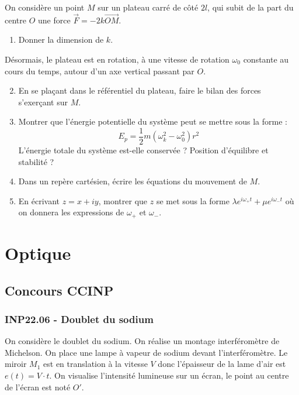 On considère un point $M$ sur un plateau carré de côté $2l$, qui subit de la part du centre $O$ une force $\overrightarrow{F} = -2k \overrightarrow{OM}$.

\begin{enumerate}
    \item Donner la dimension de $k$.
\end{enumerate}

Désormais, le plateau est en rotation, à une vitesse de rotation $\omega_0$ constante au cours du temps, autour d'un axe vertical passant par $O$.

\begin{enumerate}
    \setcounter{enumi}{1}
    \item En se plaçant dans le référentiel du plateau, faire le bilan des forces s'exerçant sur $M$.
    \item Montrer que l'énergie potentielle du système peut se mettre sous la forme :
    \[
    E_p = \frac{1}{2} m \left(\omega_k^2 - \omega_0^2\right) r^2
    \]
    L'énergie totale du système est-elle conservée ? Position d'équilibre et stabilité ?
    \item Dans un repère cartésien, écrire les équations du mouvement de $M$.
    \item En écrivant $z = x + iy$, montrer que $z$ se met sous la forme $\lambda e^{i\omega_+ t} + \mu e^{i\omega_- t}$ où on donnera les expressions de $\omega_+$ et $\omega_-$.
\end{enumerate}

\newpage
\section*{Optique}
\subsection*{Concours CCINP}
\subsubsection*{INP22.06 - Doublet du sodium  \corrige}

On considère le doublet du sodium. On réalise un montage interféromètre de Michelson. On place une lampe à vapeur de sodium devant l'interféromètre. Le miroir $M_1$ est en translation à la vitesse $V$ donc l'épaisseur de la lame d'air est $e(t) = V \cdot t$. On visualise l'intensité lumineuse sur un écran, le point au centre de l'écran est noté $O'$.

